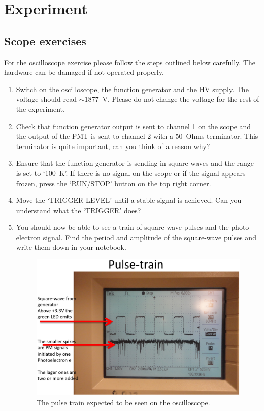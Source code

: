 \documentclass[10pt,aps,twocolumn,secnumarabic,balancelastpage,amsmath,amssymb,nofootinbib,floatfix]{revtex4}
\begin{document}
\section{Experiment}

\subsection{Scope exercises}

For the oscilloscope exercise please follow the steps outlined below carefully. The hardware can be damaged if not operated properly.

\begin{enumerate}
\item Switch on the oscilloscope, the function generator and the HV supply. The voltage should read $\sim$1877~V. Please do not change the voltage for the rest of the experiment. 

\item Check that function generator output is sent to channel 1 on the scope and the output of the PMT is sent to channel 2 with a 50~Ohms terminator. This terminator is quite important, can you think of a reason why?

\item Ensure that the function generator is sending in square-waves and the range is set to `100~K'. If there is no signal on the scope or if the signal appears frozen, press the `RUN/STOP' button on the top right corner. 

\item Move the `TRIGGER LEVEL' until a stable signal is achieved. Can you understand what the `TRIGGER' does?

\item You should now be able to see a train of square-wave pulses and the photo-electron signal. Find the period and amplitude of the square-wave pulses and write them down in your notebook. 

\begin{figure}
  \centering
  \includegraphics[width=1.0\linewidth]{figs/pulsetrain.png}
  \caption{The pulse train expected to be seen on the oscilloscope.}
  \label{fig:pulsetrain}
\end{figure}


\end{enumerate}
\end{document}
